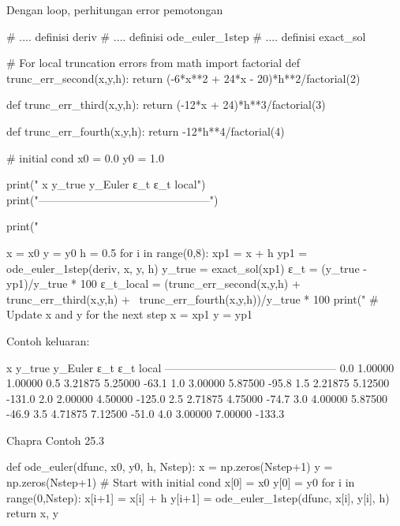 Dengan loop, perhitungan error pemotongan
\begin{pythoncode}
# .... definisi deriv
# .... definisi ode_euler_1step
# .... definisi exact_sol

# For local truncation errors
from math import factorial
def trunc_err_second(x,y,h):
    return (-6*x**2 + 24*x - 20)*h**2/factorial(2)

def trunc_err_third(x,y,h):
    return (-12*x + 24)*h**3/factorial(3)

def trunc_err_fourth(x,y,h):
    return -12*h**4/factorial(4)

# initial cond
x0 = 0.0
y0 = 1.0

print("   x     y_true   y_Euler       ε_t   ε_t local")
print("-----------------------------------------------")

print("%

x = x0
y = y0
h = 0.5
for i in range(0,8):
    xp1 = x + h
    yp1 = ode_euler_1step(deriv, x, y, h)
    y_true = exact_sol(xp1)
    ε_t = (y_true - yp1)/y_true * 100
    ε_t_local = (trunc_err_second(x,y,h) + trunc_err_third(x,y,h) + \
        trunc_err_fourth(x,y,h))/y_true * 100
    print("%
    # Update x and y for the next step
    x = xp1
    y = yp1
\end{pythoncode}

Contoh keluaran:
\begin{textcode}
   x     y_true   y_Euler       ε_t   ε_t local
-----------------------------------------------
  0.0   1.00000   1.00000
  0.5   3.21875   5.25000     -63.1%
  1.0   3.00000   5.87500     -95.8%
  1.5   2.21875   5.12500    -131.0%
  2.0   2.00000   4.50000    -125.0%
  2.5   2.71875   4.75000     -74.7%
  3.0   4.00000   5.87500     -46.9%
  3.5   4.71875   7.12500     -51.0%
  4.0   3.00000   7.00000    -133.3%
\end{textcode}
    




Chapra Contoh 25.3

\begin{pythoncode}
def ode_euler(dfunc, x0, y0, h, Nstep):
    x = np.zeros(Nstep+1)
    y = np.zeros(Nstep+1)
    # Start with initial cond
    x[0] = x0
    y[0] = y0
    for i in range(0,Nstep):
        x[i+1] = x[i] + h
        y[i+1] = ode_euler_1step(dfunc, x[i], y[i], h)
    return x, y
\end{pythoncode}

